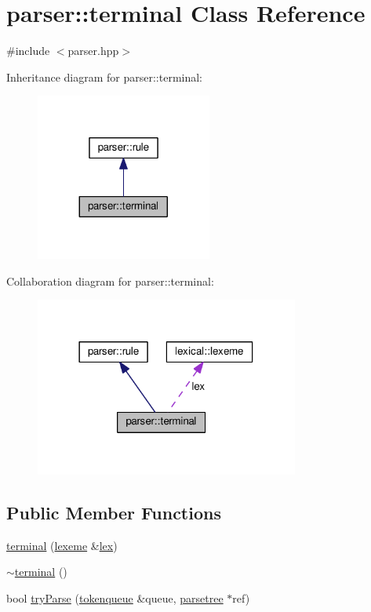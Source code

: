 \hypertarget{classparser_1_1terminal}{}\section{parser\+:\+:terminal Class Reference}
\label{classparser_1_1terminal}


{\ttfamily \#include $<$parser.\+hpp$>$}



Inheritance diagram for parser\+:\+:terminal\+:
\nopagebreak
\begin{figure}[H]
\begin{center}
\leavevmode
\includegraphics[width=164pt]{classparser_1_1terminal__inherit__graph}
\end{center}
\end{figure}


Collaboration diagram for parser\+:\+:terminal\+:
\nopagebreak
\begin{figure}[H]
\begin{center}
\leavevmode
\includegraphics[width=246pt]{classparser_1_1terminal__coll__graph}
\end{center}
\end{figure}
\subsection*{Public Member Functions}
\begin{DoxyCompactItemize}
\item 
\hyperlink{classparser_1_1terminal_a0029f9a855c1d9dd6939c8fdd5107d72}{terminal} (\hyperlink{classlexical_1_1lexeme}{lexeme} \&\hyperlink{classparser_1_1terminal_a497d13e62829b69f558be62614846236}{lex})
\item 
\hyperlink{classparser_1_1terminal_a04f78fdc1855ad6a61909d1c9ae0df13}{$\sim$terminal} ()
\item 
bool \hyperlink{classparser_1_1terminal_abf7f4ea72388f2e96140769bc5d2acc8}{try\+Parse} (\hyperlink{classparser_1_1tokenqueue}{tokenqueue} \&queue, \hyperlink{structparser_1_1parsetree}{parsetree} $\ast$ref)
\end{DoxyCompactItemize}
